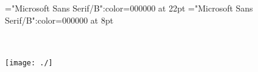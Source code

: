 \documentclass[a4paper,twoside]{article}
\begin{document}
\thispagestyle{empty} 
\font\CoverPageTitle="Microsoft Sans Serif/B":color=000000 at 22pt 
\font\pFrontMatterdiv="Microsoft Sans Serif/B":color=000000 at 8pt 
\vskip 60pt 
\begin{center} 
\end{center} 
\newpage 
\newpage 
\thispagestyle{empty} 
\mbox{} 
\begin{titlepage}
\begin{center}
\textsc{\LARGE {}}\\[1.5cm] 
\vspace{110 mm} 
\textsc{ }\\[0.5cm] 
\texttt{[image: ./]}\\[1cm]    
\end{center} 
\end{titlepage} 
\setcounter{page}{3} 
 
\pagestyle{plain} 
\newpage 

\mbox{} 
\newpage 
\newpage 
\setcounter{page}{1} 


\newpage 
\pagestyle{plain} 
\tableofcontents 
\newpage 

\pagestyle{fancy} 
\begin{comment}

\scrBookNamezxxscrBookscrBody{
 \label{PageStock_PreserveNKOu31} Mateo}\end{comment}
 
\end{document}
